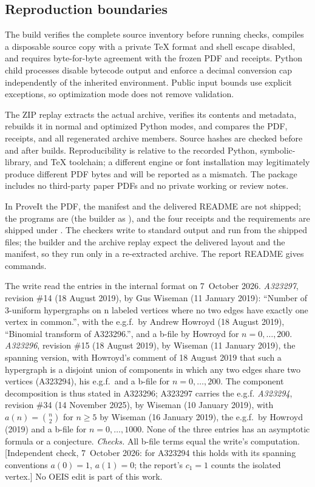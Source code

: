 \subsection{Reproduction boundaries}
The build verifies the complete source inventory before running checks, compiles a disposable source copy with a private TeX format and shell escape disabled, and requires byte-for-byte agreement with the frozen PDF and receipts. Python child processes disable bytecode output and enforce a decimal conversion cap independently of the inherited environment. Public input bounds use explicit exceptions, so optimization mode does not remove validation.

The ZIP replay extracts the actual archive, verifies its contents and metadata, rebuilds it in normal and optimized Python modes, and compares the PDF, receipts, and all regenerated archive members. Source hashes are checked before and after builds. Reproducibility is relative to the recorded Python, symbolic-library, and TeX toolchain; a different engine or font installation may legitimately produce different PDF bytes and will be reported as a mismatch. The package includes no third-party paper PDFs and no private working or review notes.
\begin{writenote}
In ProveIt the PDF, the manifest and the delivered README are not shipped; the
programs are  (the builder as ), and the
four receipts and the requirements are shipped under . The
checkers write to standard output and run from the shipped files; the builder
and the archive replay expect the delivered layout and the manifest, so they
run only in a re-extracted archive. The report README gives commands.
\end{writenote}

\begin{remark}\label{sfh:rem:oeis}
The write read the entries in the internal format on 7~October 2026.
\emph{A323297}, revision \#14 (18 August 2019), by Gus Wiseman (11 January
2019): ``Number of 3-uniform hypergraphs on n labeled vertices where no two
edges have exactly one vertex in common.'', with the e.g.f.\ by Andrew
Howroyd (18 August 2019), ``Binomial transform of A323296.'', and a b-file by
Howroyd for $n=0,\ldots,200$. \emph{A323296}, revision \#15 (18 August 2019),
by Wiseman (11 January 2019), the spanning version, with Howroyd's comment of
18 August 2019 that such a hypergraph is a disjoint union of components in
which any two edges share two vertices (A323294), his e.g.f.\ and a b-file
for $n=0,\ldots,200$. The component decomposition is thus stated in A323296;
A323297 carries the e.g.f. \emph{A323294}, revision \#34 (14 November 2025),
by Wiseman (10 January 2019), with $a(n)=\binom n2$ for $n\ge5$ by Wiseman (16
January 2019), the e.g.f.\ by Howroyd (2019) and a b-file for
$n=0,\ldots,1000$. None of the three entries has an asymptotic formula or a
conjecture. \emph{Checks.} All b-file terms equal the write's computation.
[Independent check, 7~October 2026: for A323294 this holds with its spanning
conventions $a(0)=1$, $a(1)=0$; the report's $c_1=1$ counts the isolated
vertex.] No
OEIS edit is part of this work.
\end{remark}
